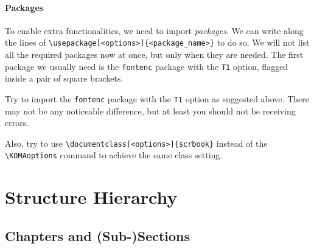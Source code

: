 \paragraph{Packages} To enable extra functionalities, we need to import \textit{packages}. We can write along the lines of \texttt{\textbackslash usepackage[<options>]\{<package\_name>\}} to do so. We will not list all the required packages now at once, but only when they are needed. The first package we usually need is the \verb|fontenc| package with the \verb|T1| option, flagged inside a pair of square brackets.

\begin{exercisebox}
\begin{Exercise}
Try to import the \verb|fontenc| package with the \verb|T1| option as suggested above. There may not be any noticeable difference, but at least you should not be receiving errors.
\end{Exercise}
\begin{Exercise}
Also, try to use \texttt{\textbackslash documentclass[<options>]\{scrbook\}} instead of the \texttt{\textbackslash KOMAoptions} command to achieve the same class setting.
\end{Exercise}
\end{exercisebox}

\section{Structure Hierarchy}

\subsection{Chapters and (Sub-)Sections}

